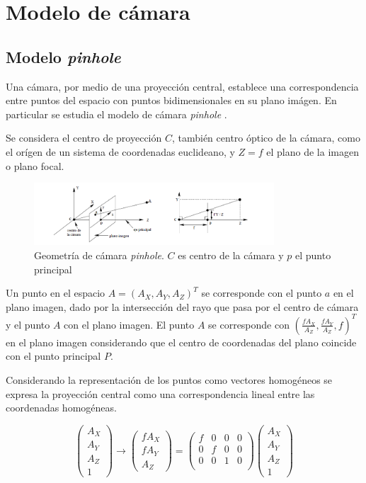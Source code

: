 ﻿\chapter{Modelo de cámara}

\section{Modelo \emph{pinhole}}

Una cámara, por medio de una proyección central, establece una correspondencia entre puntos del espacio con puntos bidimensionales en su plano imágen. En particular se estudia el modelo de cámara \emph{pinhole} \cite{LibroCompGrafica3}.

Se considera el centro de proyección $C$, también centro óptico de la cámara, como el orígen de un sistema de coordenadas euclideano, y $Z = f$ el plano de la imagen o plano focal.

\begin{figure}[H]
  \centering
    \includegraphics[width=0.8\textwidth]{./Cap2_videomapping/pinhole.png}
  \caption[Multiple View Geometry in Computer Vision, Fig. 6.1]{Geometría de cámara \emph{pinhole}. $C$ es centro de la cámara y $p$ el punto principal}
  \label{fig:Calib-Pinhole}
\end{figure}

Un punto en el espacio $A=(A_X, A_Y, A_Z)^T$ se corresponde con el punto $a$ en el plano imagen, dado por la intersección del rayo que pasa por el centro de cámara y el punto $A$ con el plano imagen. El punto $A$ se corresponde con $(\frac{fA_X}{A_Z}, \frac{fA_Y}{A_Z}, f)^T$ en el plano imagen considerando que el centro de coordenadas del plano coincide con el punto principal $P$.

Considerando la representación de los puntos como vectores homogéneos se expresa la proyección central como una correspondencia lineal entre las coordenadas homogéneas.

\[
\begin{pmatrix}
A_X \\ A_Y \\ A_Z \\ 1
\end{pmatrix}
\to
\begin{pmatrix}
fA_X \\ fA_Y \\ A_Z
\end{pmatrix}
=
\begin{pmatrix}
f & 0 & 0 & 0 \\
0 & f & 0 & 0 \\
0 & 0 & 1 & 0 \\
\end{pmatrix}
\begin{pmatrix}
A_X \\ A_Y \\ A_Z \\ 1
\end{pmatrix}
\]

